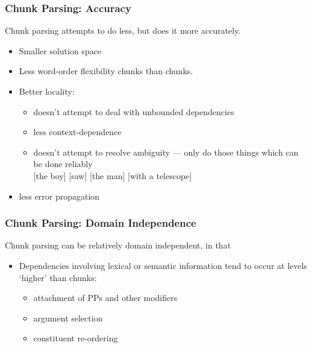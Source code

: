 

\begin{frame}[fragile]
  \frametitle{Chunk Parsing: Accuracy}

Chunk parsing attempts to do less, but does it more accurately.
  \begin{itemize}
  \item Smaller solution space
  \item Less word-order flexibility  chunks than
     chunks.
  \item Better locality:
    \begin{itemize}
      \item doesn't attempt to deal with unbounded dependencies
      \item less context-dependence
      \item doesn't attempt to resolve ambiguity --- only do those
        things which can be done reliably\\
        {}[the boy] [saw] [the man] [with a telescope]
    \end{itemize}
  \item less error propagation
  
    
  \end{itemize}

\end{frame}

\begin{frame}[fragile]
 \frametitle{Chunk Parsing: Domain Independence}

Chunk parsing can be relatively domain independent, in that
 \begin{itemize}
   \item Dependencies involving lexical or semantic information tend to
     occur at levels `higher' than chunks:
     \begin{itemize}
       \item attachment of PPs and other modifiers
       \item argument selection
       \item constituent re-ordering
     \end{itemize}
 \end{itemize}

\end{frame}

